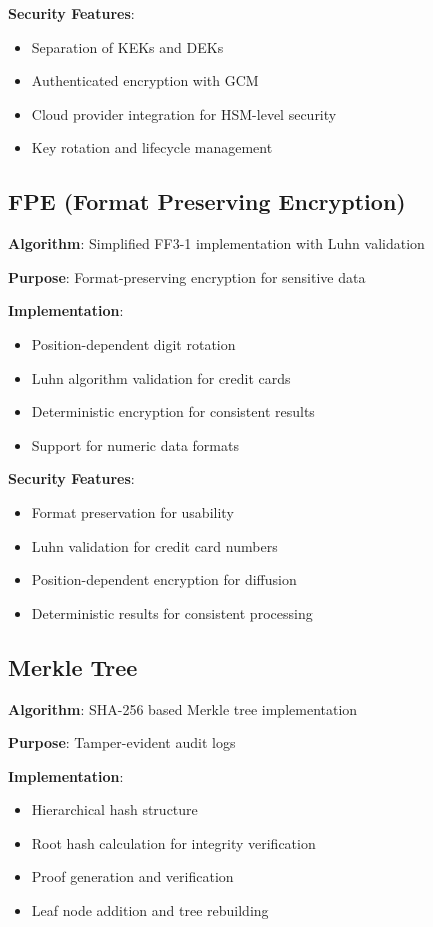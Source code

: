 \documentclass[12pt]{article}
\begin{document}
\textbf{Security Features}:
\begin{itemize}
    \item Separation of KEKs and DEKs
    \item Authenticated encryption with GCM
    \item Cloud provider integration for HSM-level security
    \item Key rotation and lifecycle management
\end{itemize}

\subsection{FPE (Format Preserving Encryption)}

\textbf{Algorithm}: Simplified FF3-1 implementation with Luhn validation

\textbf{Purpose}: Format-preserving encryption for sensitive data

\textbf{Implementation}:
\begin{itemize}
    \item Position-dependent digit rotation
    \item Luhn algorithm validation for credit cards
    \item Deterministic encryption for consistent results
    \item Support for numeric data formats
\end{itemize}

\textbf{Security Features}:
\begin{itemize}
    \item Format preservation for usability
    \item Luhn validation for credit card numbers
    \item Position-dependent encryption for diffusion
    \item Deterministic results for consistent processing
\end{itemize}

\subsection{Merkle Tree}

\textbf{Algorithm}: SHA-256 based Merkle tree implementation

\textbf{Purpose}: Tamper-evident audit logs

\textbf{Implementation}:
\begin{itemize}
    \item Hierarchical hash structure
    \item Root hash calculation for integrity verification
    \item Proof generation and verification
    \item Leaf node addition and tree rebuilding
\end{itemize}
\end{document}
